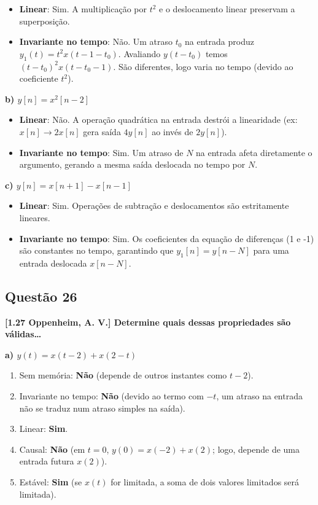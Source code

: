 \begin{itemize}
\tightlist
\item
  \textbf{Linear}: Sim. A multiplicação por \(t^2\) e o deslocamento linear preservam a superposição.
\item
  \textbf{Invariante no tempo}: Não. Um atraso \(t_0\) na entrada produz \(y_1(t) = t^2 x(t - 1 - t_0)\). Avaliando \(y(t - t_0)\) temos \((t-t_0)^2 x(t - t_0 - 1)\). São diferentes, logo varia no tempo (devido ao coeficiente \(t^2\)).
\end{itemize}

\textbf{b) \(y[n] = x^2[n - 2]\)}

\begin{itemize}
\tightlist
\item
  \textbf{Linear}: Não. A operação quadrática na entrada destrói a linearidade (ex: \(x[n] \to 2x[n]\) gera saída \(4y[n]\) ao invés de \(2y[n]\)).
\item
  \textbf{Invariante no tempo}: Sim. Um atraso de \(N\) na entrada afeta diretamente o argumento, gerando a mesma saída deslocada no tempo por \(N\).
\end{itemize}

\textbf{c) \(y[n] = x[n + 1] - x[n - 1]\)}

\begin{itemize}
\tightlist
\item
  \textbf{Linear}: Sim. Operações de subtração e deslocamentos são estritamente lineares.
\item
  \textbf{Invariante no tempo}: Sim. Os coeficientes da equação de diferenças (1 e -1) são constantes no tempo, garantindo que \(y_1[n] = y[n-N]\) para uma entrada deslocada \(x[n-N]\).
\end{itemize}

\subsection{Questão 26}\label{questuxe3o-26}

\textbf{{[}1.27 Oppenheim, A. V.{]} Determine quais dessas propriedades são válidas\ldots{}}

\textbf{a) \(y(t) = x(t - 2) + x(2 - t)\)}

\begin{enumerate}
\def\labelenumi{\arabic{enumi}.}
\tightlist
\item
  Sem memória: \textbf{Não} (depende de outros instantes como \(t-2\)).
\item
  Invariante no tempo: \textbf{Não} (devido ao termo com \(-t\), um atraso na entrada não se traduz num atraso simples na saída).
\item
  Linear: \textbf{Sim}.
\item
  Causal: \textbf{Não} (em \(t=0\), \(y(0) = x(-2) + x(2)\); logo, depende de uma entrada futura \(x(2)\)).
\item
  Estável: \textbf{Sim} (se \(x(t)\) for limitada, a soma de dois valores limitados será limitada).
\end{enumerate}

